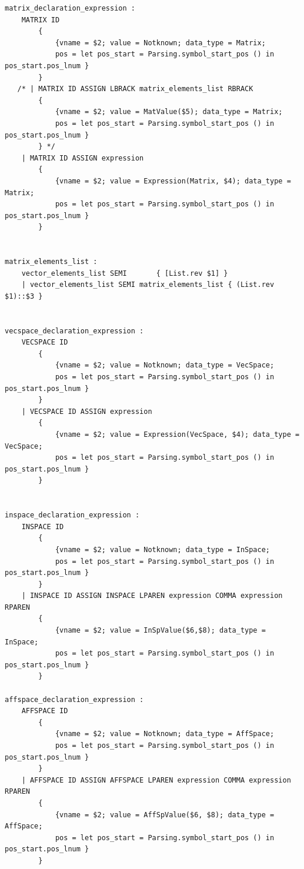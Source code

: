 \documentclass[12pt]{article} %
\begin{document}
\begin{lstlisting}[style=appendix, caption=parser.mly]
matrix_declaration_expression :
    MATRIX ID   
        { 
            {vname = $2; value = Notknown; data_type = Matrix; 
            pos = let pos_start = Parsing.symbol_start_pos () in pos_start.pos_lnum } 
        }
   /* | MATRIX ID ASSIGN LBRACK matrix_elements_list RBRACK 
        { 
            {vname = $2; value = MatValue($5); data_type = Matrix; 
            pos = let pos_start = Parsing.symbol_start_pos () in pos_start.pos_lnum } 
        } */
    | MATRIX ID ASSIGN expression
        { 
            {vname = $2; value = Expression(Matrix, $4); data_type = Matrix; 
            pos = let pos_start = Parsing.symbol_start_pos () in pos_start.pos_lnum } 
        }


matrix_elements_list :
    vector_elements_list SEMI       { [List.rev $1] }
    | vector_elements_list SEMI matrix_elements_list { (List.rev $1)::$3 }


vecspace_declaration_expression :
    VECSPACE ID 
        { 
            {vname = $2; value = Notknown; data_type = VecSpace; 
            pos = let pos_start = Parsing.symbol_start_pos () in pos_start.pos_lnum }
        }
    | VECSPACE ID ASSIGN expression
        {
            {vname = $2; value = Expression(VecSpace, $4); data_type = VecSpace;
            pos = let pos_start = Parsing.symbol_start_pos () in pos_start.pos_lnum }
        }


inspace_declaration_expression :
    INSPACE ID  
        { 
            {vname = $2; value = Notknown; data_type = InSpace; 
            pos = let pos_start = Parsing.symbol_start_pos () in pos_start.pos_lnum } 
        }
    | INSPACE ID ASSIGN INSPACE LPAREN expression COMMA expression RPAREN 
        { 
            {vname = $2; value = InSpValue($6,$8); data_type = InSpace; 
            pos = let pos_start = Parsing.symbol_start_pos () in pos_start.pos_lnum } 
        }

affspace_declaration_expression :
    AFFSPACE ID 
        { 
            {vname = $2; value = Notknown; data_type = AffSpace; 
            pos = let pos_start = Parsing.symbol_start_pos () in pos_start.pos_lnum } 
        }
    | AFFSPACE ID ASSIGN AFFSPACE LPAREN expression COMMA expression RPAREN 
        { 
            {vname = $2; value = AffSpValue($6, $8); data_type = AffSpace; 
            pos = let pos_start = Parsing.symbol_start_pos () in pos_start.pos_lnum } 
        }


\end{lstlisting}
\end{document}
